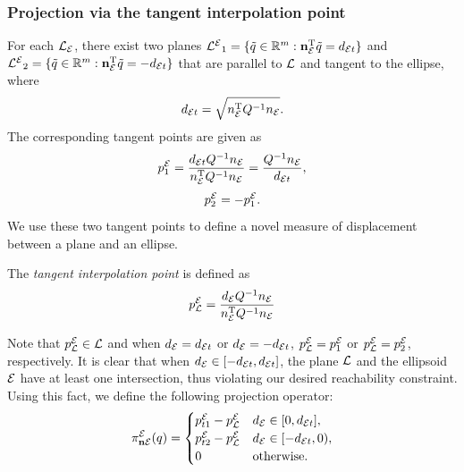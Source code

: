 \documentclass[journal]{IEEEtran}  %
\begin{document}
\subsubsection{Projection via the tangent interpolation point}
  For each $\mathcal{L}_{\mathcal{E}}$, there exist two planes ${\mathcal{L}^{\mathcal{E}}}_{1} = \{\tilde{q}\in\mathbb{R}^m: \mathbf{n}_{\mathcal{E}} ^\mathrm{T} \tilde{q} =  d_{\mathcal{E} t} \}$ and ${\mathcal{L}^{\mathcal{E}}}_{2} = \{\tilde{q}\in\mathbb{R}^m: \mathbf{n}_{\mathcal{E}} ^\mathrm{T} \tilde{q} = - d_{\mathcal{E} t} \}$ that are parallel to $\mathcal{L}$ and tangent to the ellipse, where
  \begin{equation}
    d_{\mathcal{E} t} = \sqrt{ n_{\mathcal{E}}^\mathrm{T} Q^{-1} n_{\mathcal{E}}}.
  \end{equation}
  The corresponding tangent points are given as 
  \begin{equation}
    p^{\mathcal{E}}_{1} = \frac{  d_{\mathcal{E} t} Q^{-1}   n_{\mathcal{E}}}{ n_{\mathcal{E}} ^\mathrm{T} Q^{-1}  n_{\mathcal{E}}} = \frac{Q^{-1} n_{\mathcal{E}}}{ d_{\mathcal{E} t}},
  \end{equation}
  \begin{equation}
   p^{\mathcal{E}}_{2} = -  p^{\mathcal{E}}_{1}.
  \end{equation}
  We use these two tangent points to define a novel measure of displacement between a plane and an ellipse.
  \begin{definition}
    The \emph{tangent interpolation point} is defined as 
    \begin{equation}\label{equ:ProjectPoint}
      p^{\mathcal{E}}_{\mathcal{L}} = \frac{ d_{\mathcal{E}} Q^{-1} n_{\mathcal{E}}}{ n_{\mathcal{E}}^\mathrm{T} Q^{-1} n_{\mathcal{E}}}
    \end{equation}
  \end{definition}
  Note that $p^{\mathcal{E}}_{\mathcal{L}} \in \mathcal{L}$ and when  $d_{\mathcal{E}}=d_{\mathcal{E} t}$ or $d_{\mathcal{E}}=-d_{\mathcal{E} t}$, $p^{\mathcal{E}}_{\mathcal{L}}=p^{\mathcal{E}}_{1}$ or $p^{\mathcal{E}}_{\mathcal{L}}=p^{\mathcal{E}}_{2}$, respectively. 
  It is clear that when $ d_{\mathcal{E}} \in [- d_{\mathcal{E} t},  d_{\mathcal{E} t}]$, the plane $\mathcal{L}$ and the ellipsoid $\mathcal{E}$ have at least one intersection, thus violating our desired reachability constraint. Using this fact, we define the following projection operator:
  \begin{equation}\label{equ:plane2ellipse}
    \pi^{\mathcal{E}}_{\mathbf{n} \mathcal{E}}(q) =\begin{cases}
      p^{\mathcal{E}}_{t1}-p^{\mathcal{E}}_{\mathcal{L}} &  d_{\mathcal{E}} \in [0, d_{\mathcal{E} t}], \\
      p^{\mathcal{E}}_{t2}-p^{\mathcal{E}}_{\mathcal{L}} &  d_{\mathcal{E}} \in [- d_{\mathcal{E} t},0), \\
      {0} & \textrm{otherwise}.
    \end{cases}
  \end{equation}
\end{document}
